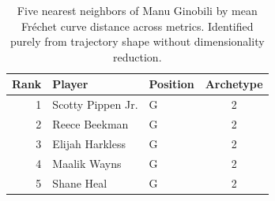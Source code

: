 \begin{table}[htbp]
  \centering\small
  \begin{tabular}{rllc}
    \toprule
    Rank & Player & Position & Archetype \\
    \midrule
    1 & Scotty Pippen Jr. & G & 2 \\
    2 & Reece Beekman & G & 2 \\
    3 & Elijah Harkless & G & 2 \\
    4 & Maalik Wayns & G & 2 \\
    5 & Shane Heal & G & 2 \\
    \bottomrule
  \end{tabular}
  \caption{Five nearest neighbors of Manu Ginobili by mean Fr\'{e}chet curve distance across metrics. Identified purely from trajectory shape without dimensionality reduction.}
  \label{tab:Manu_Ginobili_frechet_curve_neighbors}
\end{table}

